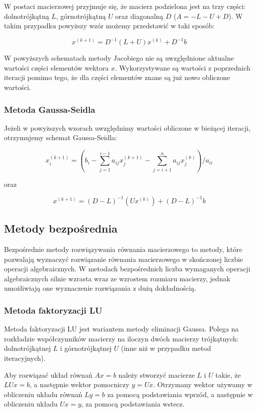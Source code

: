 \documentclass{article}
\begin{document}
W postaci macierzowej przyjmuje się, że macierz podzielona jest na trzy części: dolnotrójkątną $L$, górnotrójkątną $U$ oraz diagonalną $D$ ($A = -L - U + D$). W takim przypadku powyższy wzór możemy przedstawić w taki sposób:

\[x^{(k+1)} = D^{-1}(L+U)x^{(k)} + D^{-1}b\]

W powyższych schematach metody Jacobiego nie są uwzględnione aktualne wartości części elementów wektora $x$. Wykorzystywane są wartości z poprzednich iteracji pomimo tego, że dla części elementów znane są już nowo obliczone wartości.

\subsubsection{Metoda Gaussa-Seidla}

Jeżeli w powyższych wzorach uwzględnimy wartości obliczone w bieżącej iteracji, otrzymujemy schemat Gaussa-Seidla:

\[x_{i}^{(k+1)} = (b_{i} - \sum_{j=1}^{i-1} a_{ij}x_{j}^{(k+1)} - \sum_{j=i+1}^{n} a_{ij}x_{j}^{(k)}) / a_{ii}\]

\begin{center}oraz\end{center}

\[x^{(k+1)} = (D-L)^{-1}(Ux^{(k)}) + (D-L)^{-1}b\]

\subsection{Metody bezpośrednia}

Bezpośrednie metody rozwiązywania równania macierzowego to metody, które pozwalają wyznaczyć rozwiązanie równania macierzowego w skończonej liczbie operacji algebraicznych. W metodach bezpośrednich liczba wymaganych operacji algebraicznych silnie wzrasta wraz ze wzrostem rozmiaru macierzy, jednak umożliwiają one wyznaczenie rozwiązania z dużą dokładnością.

\subsubsection{Metoda faktoryzacji LU}

Metoda faktoryzacji LU jest wariantem metody eliminacji Gaussa. Polega na rozkładzie współczynników macierzy na iloczyn dwóch macierzy trójkątnych: dolnotrójkątnej $L$ i górnotrójkątnej $U$ (inne niż w przypadku metod iteracyjnych).

Aby rozwiązać układ równań $Ax=b$ należy stworzyć macierze $L$ i $U$ takie, że $LUx=b$, a następnie wektor pomocniczy $y=Ux$. Otrzymany wektor używamy w obliczeniu układu równań $Ly=b$ za pomocą podstawiania wprzód, a następnie w obliczeniu układu $Ux=y$, za pomocą podstawiania wstecz.
\end{document}
